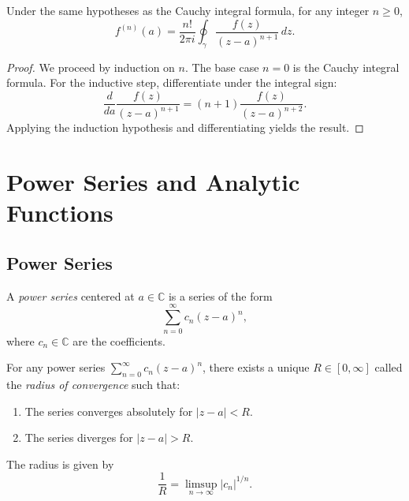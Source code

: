 \begin{corollary}
  Under the same hypotheses as the Cauchy integral formula, for any integer $n \geq 0$,
  \begin{equation}
    f^{(n)}(a) = \frac{n!}{2\pi i} \oint_{\gamma} \frac{f(z)}{(z - a)^{n+1}} \, dz.
  \end{equation}
\end{corollary}

\begin{proof}
  We proceed by induction on $n$. The base case $n = 0$ is the Cauchy integral formula.
  For the inductive step, differentiate under the integral sign:
  \[
    \frac{d}{da} \frac{f(z)}{(z-a)^{n+1}} = (n+1) \frac{f(z)}{(z-a)^{n+2}}.
  \]
  Applying the induction hypothesis and differentiating yields the result.
\end{proof}

\chapter{Power Series and Analytic Functions}

\section{Power Series}

\begin{definition}
  A \emph{power series} centered at $a \in \mathbb{C}$ is a series of the form
  \begin{equation}
    \sum_{n=0}^{\infty} c_n (z - a)^n,
  \end{equation}
  where $c_n \in \mathbb{C}$ are the coefficients.
\end{definition}

\begin{theorem}
  For any power series $\sum_{n=0}^{\infty} c_n (z-a)^n$, there exists a unique $R \in [0, \infty]$ called the \emph{radius of convergence} such that:
  \begin{enumerate}
    \item The series converges absolutely for $|z - a| < R$.
    \item The series diverges for $|z - a| > R$.
  \end{enumerate}
  The radius is given by
  \begin{equation}
    \frac{1}{R} = \limsup_{n \to \infty} |c_n|^{1/n}.
  \end{equation}
\end{theorem}

